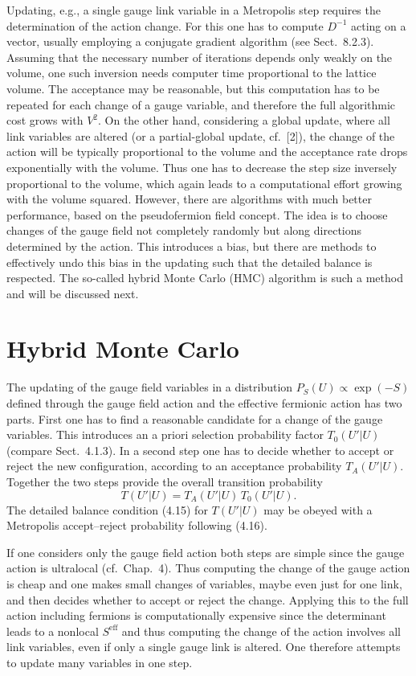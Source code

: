 Updating, e.g., a single gauge link variable in a Metropolis step requires the
determination of the action change. For this one has to compute $D^{-1}$ acting
on a vector, usually employing a conjugate gradient algorithm (see
Sect.~8.2.3). Assuming that the necessary number of iterations depends only
weakly on the volume, one such inversion needs computer time proportional to
the lattice volume. The acceptance may be reasonable, but this computation has
to be repeated for each change of a gauge variable, and therefore the full
algorithmic cost grows with $V^2$.
On the other hand, considering a global update, where all link variables are
altered (or a partial-global update, cf.\ [2]), the change of the action will
be typically proportional to the volume and the acceptance rate drops
exponentially with the volume. Thus one has to decrease the step size inversely
proportional to the volume, which again leads to a computational effort growing
with the volume squared.
However, there are algorithms with much better performance, based on the
pseudofermion field concept. The idea is to choose changes of the gauge field
not completely randomly but along directions determined by the action. This
introduces a bias, but there are methods to effectively undo this bias in the
updating such that the detailed balance is respected. The so-called hybrid
Monte Carlo (HMC) algorithm is such a method and will be discussed next.

\section{Hybrid Monte Carlo}

The updating of the gauge field variables in a distribution
$P_S(U) \propto \exp(-S)$ defined through the gauge field action and the
effective fermionic action has two parts. First one has to find a reasonable
candidate for a change of the gauge variables. This introduces an a priori
selection probability factor $T_0(U'|U)$ (compare Sect.~4.1.3). In a second
step one has to decide whether to accept or reject the new configuration,
according to an acceptance probability $T_A(U'|U)$. Together the two steps
provide the overall transition probability
\begin{equation}
T(U'|U) = T_A(U'|U)\,T_0(U'|U).
\end{equation}
The detailed balance condition (4.15) for $T(U'|U)$ may be obeyed with a
Metropolis accept--reject probability following (4.16).

If one considers only the gauge field action both steps are simple since the
gauge action is ultralocal (cf.\ Chap.~4). Thus computing the change of the
gauge action is cheap and one makes small changes of variables, maybe even just
for one link, and then decides whether to accept or reject the change.
Applying this to the full action including fermions is computationally
expensive since the determinant leads to a nonlocal $S^{\mathrm{eff}}$ and thus
computing the change of the action involves all link variables, even if only a
single gauge link is altered. One therefore attempts to update many variables
in one step.

